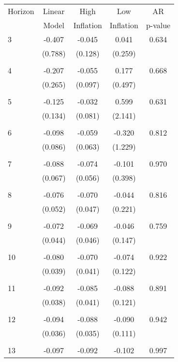 \begin{tabular}{l*{1}{cccc}}
\hline\hline
 Horizon  & Linear & High                 & Low           & AR            \\
                  & Model         & Inflation & Inflation & p-value       \\
\hline
   3       & -0.407 & -0.045 & 0.041 & 0.634 \\
          & (0.788) & (0.128) & (0.259) & \\
 & & & &\\
   4       & -0.207 & -0.055 & 0.177 & 0.668 \\
          & (0.265) & (0.097) & (0.497) & \\
 & & & &\\
   5       & -0.125 & -0.032 & 0.599 & 0.631 \\
          & (0.134) & (0.081) & (2.141) & \\
 & & & &\\
   6       & -0.098 & -0.059 & -0.320 & 0.812 \\
          & (0.086) & (0.063) & (1.229) & \\
 & & & &\\
   7       & -0.088 & -0.074 & -0.101 & 0.970 \\
          & (0.067) & (0.056) & (0.398) & \\
 & & & &\\
   8       & -0.076 & -0.070 & -0.044 & 0.816 \\
          & (0.052) & (0.047) & (0.221) & \\
 & & & &\\
   9       & -0.072 & -0.069 & -0.046 & 0.759 \\
          & (0.044) & (0.046) & (0.147) & \\
 & & & &\\
  10       & -0.080 & -0.070 & -0.074 & 0.922 \\
          & (0.039) & (0.041) & (0.122) & \\
 & & & &\\
  11       & -0.092 & -0.085 & -0.088 & 0.891 \\
          & (0.038) & (0.041) & (0.121) & \\
 & & & &\\
  12       & -0.094 & -0.088 & -0.090 & 0.942 \\
          & (0.036) & (0.035) & (0.111) & \\
 & & & &\\
  13       & -0.097 & -0.092 & -0.102 & 0.997 \\

\end{tabular}
